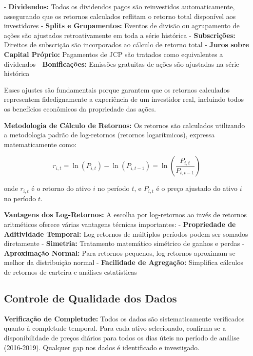 - \textbf{Dividendos:} Todos os dividendos pagos são reinvestidos automaticamente, assegurando que os retornos calculados reflitam o retorno total disponível aos investidores
- \textbf{Splits e Grupamentos:} Eventos de divisão ou agrupamento de ações são ajustados retroativamente em toda a série histórica
- \textbf{Subscrições:} Direitos de subscrição são incorporados ao cálculo de retorno total
- \textbf{Juros sobre Capital Próprio:} Pagamentos de JCP são tratados como equivalentes a dividendos
- \textbf{Bonificações:} Emissões gratuitas de ações são ajustadas na série histórica

Esses ajustes são fundamentais porque garantem que os retornos calculados representem fidedignamente a experiência de um investidor real, incluindo todos os benefícios econômicos da propriedade das ações.

\textbf{Metodologia de Cálculo de Retornos:} Os retornos são calculados utilizando a metodologia padrão de log-retornos (retornos logarítmicos), expressa matematicamente como:

\begin{equation}
r_{i,t} = \ln(P_{i,t}) - \ln(P_{i,t-1}) = \ln\left(\frac{P_{i,t}}{P_{i,t-1}}\right)
\end{equation}

onde $r_{i,t}$ é o retorno do ativo $i$ no período $t$, e $P_{i,t}$ é o preço ajustado do ativo $i$ no período $t$.

\textbf{Vantagens dos Log-Retornos:} A escolha por log-retornos ao invés de retornos aritméticos oferece várias vantagens técnicas importantes:
- \textbf{Propriedade de Aditividade Temporal:} Log-retornos de múltiplos períodos podem ser somados diretamente
- \textbf{Simetria:} Tratamento matemático simétrico de ganhos e perdas
- \textbf{Aproximação Normal:} Para retornos pequenos, log-retornos aproximam-se melhor da distribuição normal
- \textbf{Facilidade de Agregação:} Simplifica cálculos de retornos de carteira e análises estatísticas

\subsection{Controle de Qualidade dos Dados}

\textbf{Verificação de Completude:} Todos os dados são sistematicamente verificados quanto à completude temporal. Para cada ativo selecionado, confirma-se a disponibilidade de preços diários para todos os dias úteis no período de análise (2016-2019). Qualquer gap nos dados é identificado e investigado.

